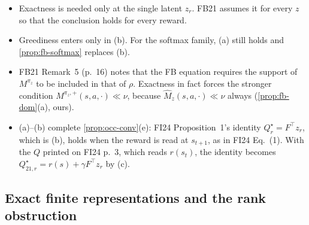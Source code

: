 \begin{remark}\label{rem:fb-opt-uses}
\leavevmode
\begin{itemize}[nosep]
\item Exactness is needed only at the single latent $z_r$. FB21 assumes it for every $z$ so that the conclusion holds for every reward.
\item Greediness enters only in (b). For the softmax family, (a) still holds and \cref{prop:fb-softmax} replaces (b).
\item FB21 Remark~5 (p.~16) notes that the FB equation requires the support of $M^{\pi_z}$ to be included in that of $\rho$. Exactness in fact forces the stronger condition $M^{\pi_z,+}(s,a,\cdot)\ll\nu$, because $\hat M_z(s,a,\cdot)\ll\nu$ always (\cref{prop:fb-dom}(a), ours).
\item (a)--(b) complete \cref{prop:occ-conv}(e): FI24 Proposition~1's identity $Q^\star_r=F^\top z_r$, which is (b), holds when the reward is read at $s_{t+1}$, as in FI24 Eq.~(1). With the $Q$ printed on FI24 p.~3, which reads $r(s_t)$, the identity becomes $Q^\star_{21,r}=r(s)+\gamma F^\top z_r$ by (c).
\end{itemize}
\end{remark}

\subsection{Exact finite representations and the rank obstruction}\label{sec:fb-exist}

